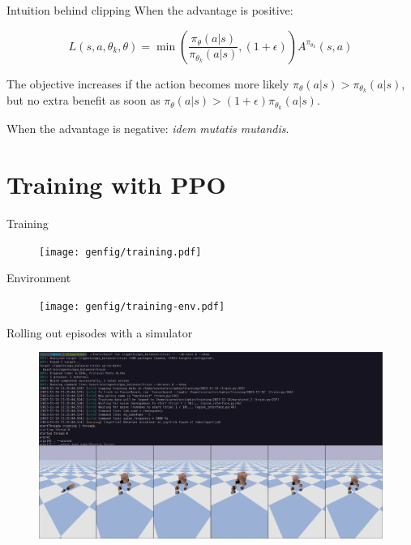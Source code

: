 \documentclass[10pt, aspectratio=1610]{beamer}
\begin{document}
\begin{frame}{Intuition behind clipping}
    When the advantage is positive:

    $$L(s,a,\theta_k,\theta) = \min\left( \frac{\pi_{\theta}(a|s)}{\pi_{\theta_k}(a|s)}, (1 + \epsilon) \right) A^{\pi_{\theta_k}}(s,a)$$

    The objective increases if the action becomes more likely $\pi_{\theta}(a|s) > \pi_{\theta_k}(a|s)$, but no extra benefit as soon as $ \pi_{\theta}(a|s) > (1+\epsilon) \pi_{\theta_k}(a|s)$.

    When the advantage is negative: \emph{idem} \emph{mutatis mutandis}.
\end{frame}

\section{Training with PPO}

\begin{frame}{Training}
    \begin{figure}
        \texttt{[image: genfig/training.pdf]}
    \end{figure}
\end{frame}

\begin{frame}{Environment}
    \begin{figure}
        \texttt{[image: genfig/training-env.pdf]}
    \end{figure}
\end{frame}

\begin{frame}{Rolling out episodes with a simulator}
    \begin{figure}
        \includegraphics[width=\columnwidth]{figures/upkie-training.png}
    \end{figure}
\end{frame}
\end{document}
